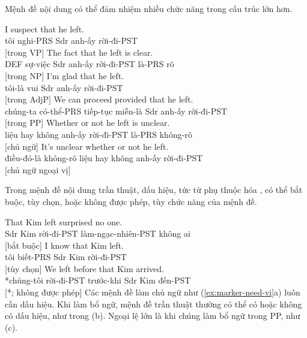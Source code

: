 Mệnh đề nội dung có thể đảm nhiệm nhiều chức năng trong cấu trúc lớn hơn.

\ea \label{ex:content-funcs-vi}
    \ea \gll I suspect {\ob}that he left{\cb}.\\
        tôi nghi-PRS Sdr anh-ấy rời-đi-PST\\
    \glt {} [trong VP]
    \ex \gll The fact {\ob}that he left{\cb} is clear.\\
        DEF sự-việc Sdr anh-ấy rời-đi-PST là-PRS rõ\\
    \glt {} [trong NP]
    \ex \gll I'm glad {\ob}that he left{\cb}.\\
        tôi-là vui Sdr anh-ấy rời-đi-PST\\
    \glt {} [trong AdjP]
    \ex \gll We can proceed provided {\ob}that he left{\cb}.\\
        chúng-ta có-thể-PRS tiếp-tục miễn-là Sdr anh-ấy rời-đi-PST\\
    \glt {} [trong PP]
    \ex \gll Whether or not he left is unclear.\\
        liệu hay không anh-ấy rời-đi-PST là-PRS không-rõ\\
    \glt {} [chủ ngữ]
    \ex \gll It's unclear whether or not he left.\\
        điều-đó-là không-rõ liệu hay không anh-ấy rời-đi-PST\\
    \glt {} [chủ ngữ ngoại vị]
    \z
\z

Trong mệnh đề nội dung trần thuật, dấu hiệu, tức từ phụ thuộc hóa , có thể bắt buộc, tùy chọn, hoặc không được phép, tùy chức năng của mệnh đề.

\ea\label{ex:marker-need-vi}
    \ea \gll That Kim left surprised no one.\\
        Sdr Kim rời-đi-PST làm-ngạc-nhiên-PST không ai\\
    \glt {} [bắt buộc]
    \ex \gll I know that Kim left.\\
        tôi biết-PRS Sdr Kim rời-đi-PST\\
    \glt {} [tùy chọn]
    \ex \gll *We left before that Kim arrived.\\
        *chúng-tôi rời-đi-PST trước-khi Sdr Kim đến-PST\\
    \glt {} [*; không được phép]
\z
\z
Các mệnh đề làm chủ ngữ như (\ref{ex:marker-need-vi}a) luôn cần dấu hiệu. Khi làm bổ ngữ, mệnh đề trần thuật thường có thể có hoặc không có dấu hiệu, như trong (b). Ngoại lệ lớn là khi chúng làm bổ ngữ trong PP, như (c).

